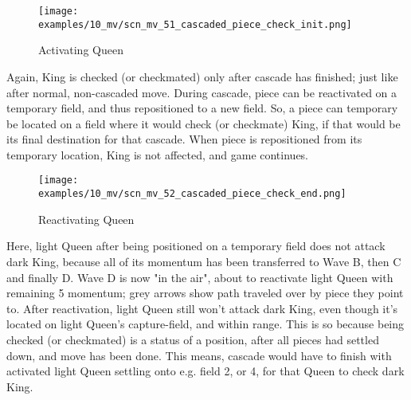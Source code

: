 \vspace*{-1.4\baselineskip}
\noindent
\begin{figure}[!h]
\texttt{[image: examples/10\_mv/scn\_mv\_51\_cascaded\_piece\_check\_init.png]}
\caption{Activating Queen}
\label{fig:scn_mv_51_cascaded_piece_check_init}
\end{figure}

Again, King is checked (or checkmated) only after cascade has finished; just like
after normal, non-cascaded move. During cascade, piece can be reactivated on a
temporary field, and thus repositioned to a new field. So, a piece can temporary
be located on a field where it would check (or checkmate) King, if that would be
its final destination for that cascade. When piece is repositioned from its
temporary location, King is not affected, and game continues.

\clearpage %

\vspace*{-2.3\baselineskip}
\noindent
\begin{figure}[!h]
\texttt{[image: examples/10\_mv/scn\_mv\_52\_cascaded\_piece\_check\_end.png]}
\vspace*{-1.3\baselineskip}
\caption{Reactivating Queen}
\label{fig:scn_mv_52_cascaded_piece_check_end}
\end{figure}

\vspace*{-0.3\baselineskip}
Here, light Queen after being positioned on a temporary field does not attack dark
King, because all of its momentum has been transferred to Wave B, then C and finally
D. Wave D is now "in the air", about to reactivate light Queen with remaining 5
momentum; grey arrows show path traveled over by piece they point to. After
reactivation, light Queen still won't attack dark King, even though it's located on
light Queen's capture-field, and within range. This is so because being checked (or
checkmated) is a status of a position, after all pieces had settled down, and move
has been done. This means, cascade would have to finish with activated light Queen
settling onto e.g. field 2, or 4, for that Queen to check dark King.

\clearpage %

